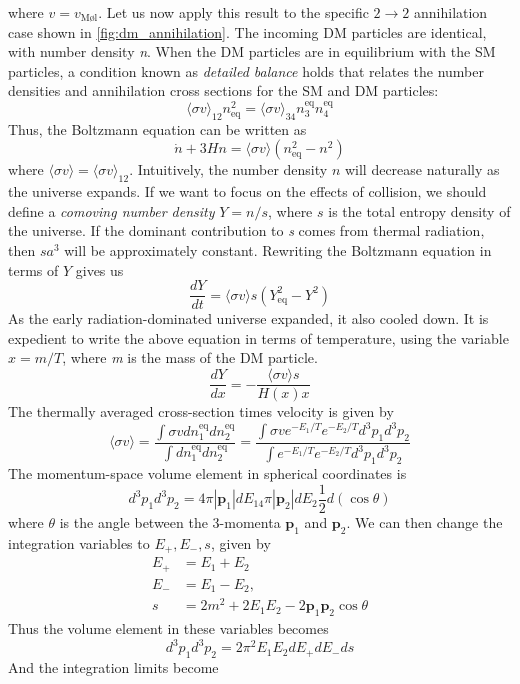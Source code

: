 where $v = v_\text{M\o l}$. Let us now apply this result to the specific $2\rightarrow 2$ annihilation case shown in \autoref{fig:dm_annihilation}. The incoming DM particles are identical, with number density \emph{n}. When the DM particles are in equilibrium with the SM particles, a condition known as \emph{detailed balance} holds that relates the number densities and annihilation cross sections for the SM and DM particles:
\[\langle\sigma v\rangle_{12}n^2_\text{eq}=\langle\sigma v\rangle_{34}n_3^\text{eq}n_4^\text{eq}\]
Thus, the Boltzmann equation can be written as
\[\dot{n}+3Hn = \langle\sigma v\rangle (n_\text{eq}^2 - n^2)\]
where $\langle\sigma v\rangle = \langle\sigma v\rangle_{12}$. Intuitively, the number density $n$ will decrease naturally as the universe expands. If we want to focus on the effects of collision, we should define a \emph{comoving number density} $Y = n/s$, where $s$ is the total entropy density of the universe. If the dominant contribution to \emph{s} comes from thermal radiation, then $sa^3$ will be approximately constant. Rewriting the Boltzmann equation in terms of $Y$ gives us
\[\frac{dY}{dt} = \langle\sigma v\rangle s (Y_\text{eq}^2 - Y^2)\]
As the early radiation-dominated universe expanded, it also cooled down. It is expedient to write the above equation in terms of temperature, using the variable $x = m/T$, where \emph{m} is the mass of the DM particle. 
\[\frac{dY}{dx} = -\frac{\langle\sigma v\rangle s}{H(x)x}\]
The thermally averaged cross-section times velocity is given by
\begin{equation}\label{eq:thermal_sigma_v}
  \langle\sigma v\rangle = \frac{\int\sigma vdn_1^\text{eq}dn_2^\text{eq}}{\int dn_1^\text{eq}dn_2^\text{eq}}
  =\frac{\int \sigma v e^{-E_1/T}e^{-E_2/T}d^3p_1d^3p_2}{\int e^{-E_1/T}e^{-E_2/T}d^3p_1d^3p_2}
\end{equation}
The momentum-space volume element in spherical coordinates is
\[d^3p_1d^3p_2 = 4\pi |\mathbf{p}_1|dE_14\pi |\mathbf{p}_2|dE_2\frac{1}{2}d(\cos\theta)\]
where $\theta$ is the angle between the 3-momenta $\mathbf{p}_1$ and $\mathbf{p}_2$. We can then change the integration variables to $E_+, E_-, s$, given by
\begin{align}
  E_+ &= E_1 + E_2\\
  E_- &= E_1 - E_2,\\
  s &= 2m^2 + 2E_1E_2-2\mathbf{p}_1\mathbf{p}_2\cos\theta
\end{align}
Thus the volume element in these variables becomes
\[d^3p_1d^3p_2 = 2\pi^2E_1E_2dE_+dE_-ds\]
And the integration limits become
